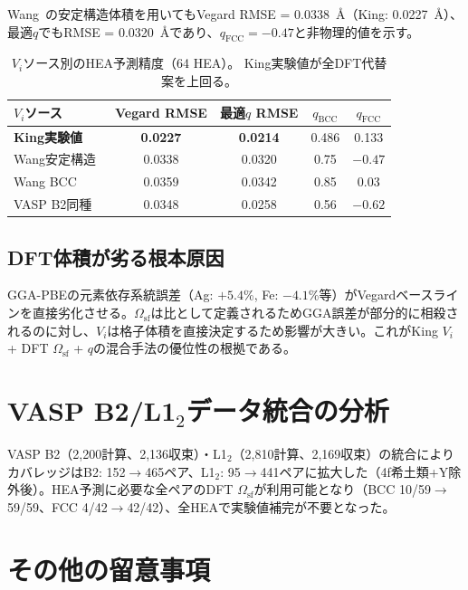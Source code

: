 \documentclass[5p,10pt]{elsarticle}
\begin{document}
Wang~\cite{Wang2004lattice}の安定構造体積を用いてもVegard RMSE = 0.0338~\AA{}（King: 0.0227~\AA{}）、最適$q$でもRMSE = 0.0320~\AA{}であり、$q_\text{FCC} = -0.47$と非物理的値を示す。

\begin{table}[H]
\centering
\caption{$V_i$ソース別のHEA予測精度（64 HEA）。
  King実験値が全DFT代替案を上回る。}
\label{tab:vi_comparison}
\footnotesize
\begin{tabular}{@{}lcccc@{}}
\toprule
$V_i$ソース & Vegard RMSE & 最適$q$ RMSE & $q_\text{BCC}$ & $q_\text{FCC}$ \\
\midrule
\textbf{King実験値}  & \textbf{0.0227} & \textbf{0.0214} & 0.486 & 0.133 \\
Wang安定構造~\cite{Wang2004lattice}   & 0.0338 & 0.0320 & 0.75 & $-0.47$ \\
Wang BCC     & 0.0359 & 0.0342 & 0.85 & 0.03 \\
VASP B2同種  & 0.0348 & 0.0258 & 0.56 & $-0.62$ \\
\bottomrule
\end{tabular}
\end{table}

\subsection{DFT体積が劣る根本原因}
\label{sec:appendix_dft_limitation}

GGA-PBEの元素依存系統誤差（Ag: $+5.4$\%, Fe: $-4.1$\%等）がVegardベースラインを直接劣化させる。$\Omega_\text{sf}$は比として定義されるためGGA誤差が部分的に相殺されるのに対し、$V_i$は格子体積を直接決定するため影響が大きい。これがKing $V_i$ + DFT $\Omega_\text{sf}$ + $q$の混合手法の優位性の根拠である。


\section{VASP B2/L1$_2$データ統合の分析}
\label{sec:appendix_vasp}

VASP B2（2,200計算、2,136収束）・L1$_2$（2,810計算、2,169収束）の統合によりカバレッジはB2: 152$\to$465ペア、L1$_2$: 95$\to$441ペアに拡大した（4f希土類+Y除外後）。HEA予測に必要な全ペアのDFT $\Omega_\text{sf}$が利用可能となり（BCC 10/59$\to$59/59、FCC 4/42$\to$42/42）、全HEAで実験値補完が不要となった。


\section{その他の留意事項}
\label{sec:appendix_notes}
\end{document}
